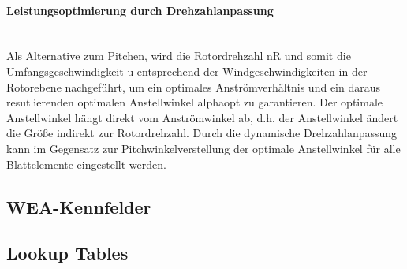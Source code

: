 \paragraph{Leistungsoptimierung durch Drehzahlanpassung}\mbox{}\smallskip\\
Als Alternative zum Pitchen, wird die Rotordrehzahl \acs{nR} und somit die Umfangsgeschwindigkeit \acs{u} entsprechend der Windgeschwindigkeiten in der Rotorebene nachgeführt, um ein optimales Anströmverhältnis und ein daraus resutlierenden optimalen Anstellwinkel \acs{alphaopt} zu garantieren. Der optimale Anstellwinkel hängt direkt vom Anströmwinkel ab, d.h. der Anstellwinkel ändert die Größe indirekt zur Rotordrehzahl. Durch die dynamische Drehzahlanpassung kann im Gegensatz zur Pitchwinkelverstellung der optimale Anstellwinkel für alle Blattelemente eingestellt werden.

\subsection{WEA-Kennfelder}

\subsection{Lookup Tables}

